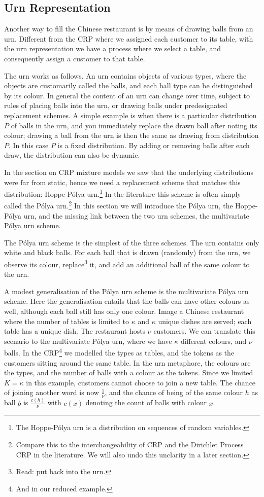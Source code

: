\subsection{Urn Representation}
Another way to fill the Chinese restaurant is by means of drawing balls from an urn. Different from the CRP where we assigned each customer to its table, with the urn representation we have a process where we select a table, and consequently assign a customer to that table.

The urn works as follows. An urn contains objects of various types, where the objects are customarily called the balls, and each ball type can be distinguished by its colour. In general the content of an urn can change over time, subject to rules of placing balls into the urn, or drawing balls under predesignated replacement schemes. A simple example is when there is a particular distribution $P$ of balls in the urn, and you immediately replace the drawn ball after noting its colour; drawing a ball from the urn is then the same as drawing from distribution $P$. In this case $P$ is a fixed distribution. By adding or removing balls after each draw, the distribution can also be dynamic.

In the section on CRP mixture models we saw that the underlying distributions were far from static, hence we need a replacement scheme that matches this distribution: Hoppe-P\'olya urn.\footnote{The Hoppe-P\'olya urn is a distribution on sequences of random variables.} In the literature this scheme is often simply called the P\'olya urn.\footnote{Compare this to the interchangeability of CRP and the Dirichlet Process CRP in the literature. We will also undo this unclarity in a later section.} In this section we will introduce the P\'olya urn, the Hoppe-P\'olya urn, and the missing link between the two urn schemes, the multivariate P\'olya urn scheme.

The P\'olya urn scheme\cite{Johnson1977Urn} is the simplest of the three schemes. The urn contains only white and black balls. For each ball that is drawn (randomly) from the urn, we observe its colour,  replace\footnote{Read: put back into the urn.} it, and add an additional ball of the same colour to the urn. 

A modest generalisation of the P\'olya urn scheme is the multivariate P\'olya urn scheme. Here the generalisation entails that the balls can have other colours as well, although each ball still has only one colour. Image a Chinese restaurant where the number of tables is limited to $\kappa$ and $\kappa$ unique dishes are served; each table has a unique dish. The restaurant hosts $\nu$ customers. We can translate this scenario to the multivariate P\'olya urn, where we have $\kappa$ different colours, and $\nu$ balls. In the CRP\footnote{And in our reduced example.} we modelled the types as tables, and the tokens as the customers sitting around the same table. In the urn metaphore, the colours are the types, and the number of balls with a colour as the tokens. Since we limited $K=\kappa$ in this example, customers cannot choose to join a new table. The chance of joining another word is now $\frac{1}{\nu}$, and the chance of being of the same colour $h$ as ball $b$ is $\frac{c(h)}{\nu}$ with $c(x)$ denoting the count of balls with colour $x$. 

